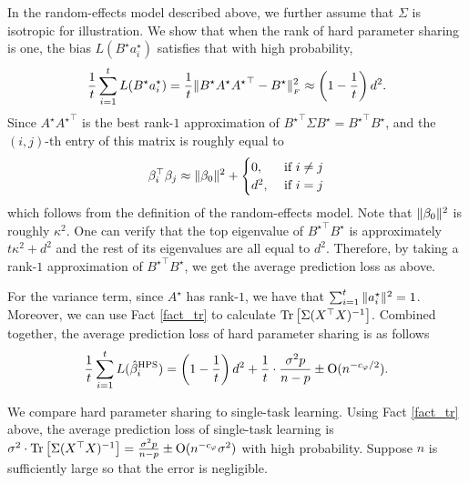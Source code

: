 \begin{example}\label{ex_same_cov}
In the random-effects model described above, we further assume that $\Sigma$ is isotropic for illustration. We show that when the rank of hard parameter sharing is one, the bias $L(B^{\star} a_i^{\star})$ satisfies that with high probability, 
\[ \frac{1}{t} \sum_{i=1}^t L(B^{\star} a_i^{\star}) = \frac{1}{t}\|B^{\star} A^{\star} {A^{\star}}^{\top} - B^{\star}\|_{_{F}}^2 \approx \left(1 - \frac{1}{t}\right) {d^2}{}  . \]
Since $A^{\star} {A^{\star}}^{\top}$ is the best rank-$1$ approximation of ${B^{\star}}^{\top}\Sigma B^{\star} = {B^{\star}}^{\top} B^{\star}$, and the $(i, j)$-th entry of this matrix is roughly equal to
\begin{align*}
	\beta_i^{\top} \beta_j \approx \|\beta_0\|^2 + \begin{cases}
																								0, &\text{ if } i \neq j \\
																								d^2, &\text{ if } i = j
	\end{cases}
\end{align*}
which follows from the definition of the random-effects model.
Note that $\|\beta_0\|^2$ is roughly $\kappa^2$.
One can verify that the top eigenvalue of ${B^{\star}}^{\top} B^{\star}$ is approximately $t \kappa^2 + d^2$ and the rest of its eigenvalues are all equal to $d^2$.
Therefore, by taking a rank-$1$ approximation of ${B^{\star}}^{\top} B^{\star}$, we get the average prediction loss as above.

For the variance term, since $A^{\star}$ has rank-$1$, we have that $\sum_{i=1}^t \|a_i^{\star}\|^2 = 1$. Moreover, we can use Fact \ref{fact_tr} to calculate $\operatorname{Tr}\left[\Sigma (X^{\top} X)^{-1}\right]$. 
Combined together, the average prediction loss of hard parameter sharing is as follows
\[ \frac{1}{t}\sum_{i=1}^t L(\hat{\beta}_i^{\textup{HPS}}) = \left({1 - \frac{1}{t}}\right) {d^2}{} + \frac{1}{t} \cdot \frac{\sigma^2 p}{n - p} \pm \operatorname{O}(n^{-c_{\varphi} / 2}) .\] %
\end{example}
We compare hard parameter sharing to single-task learning.
Using Fact \ref{fact_tr} above, the average prediction loss of single-task learning is $\sigma^2\cdot \operatorname{Tr}\left[\Sigma (X^{\top} X)^{-1}\right] = \frac{\sigma^2 p}{n - p}  \pm \operatorname{O}(n^{-c_\varphi} \sigma^2)$ with high probability.
	Suppose $n$ is sufficiently large so that the error is negligible.

